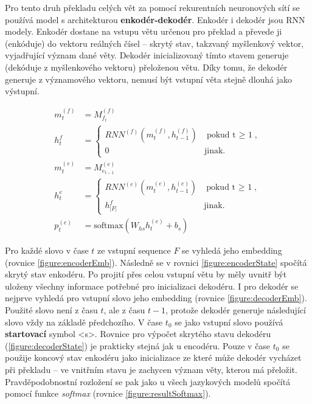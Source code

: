 Pro tento druh překladu celých vět za pomocí rekurentních neuronových sítí se používá model s architekturou \textbf{enkodér-dekodér}. Enkodér i dekodér jsou RNN modely. Enkodér dostane na vstupu větu určenou pro překlad a převede ji (enkóduje) do vektoru reálných čísel -- skrytý stav, takzvaný myšlenkový vektor, vyjadřující význam dané věty. Dekodér inicializovaný tímto stavem generuje (dekóduje z myšlenkového vektoru) přeloženou větu. Díky tomu, že dekodér generuje z významového vektoru, nemusí být vstupní věta stejně dlouhá jako výstupní.


\begin{align}
    m^{(f)}_{t}&=M^{(f)}_{f_t}\label{figure:encoderEmb} \\
    h^{f}_{t}&=\begin{cases}
                    RNN^{(f)}(m^{(f)}_{t},h^{(f)}_{t-1}) & \mbox{pokud t $\geq$ 1},\label{figure:encoderState} \\
                    0 & \mbox{jinak}.
                \end{cases}\\
    m^{(e)}_{t}&=M^{(e)}_{e_{t-1}}\label{figure:decoderEmb} \\
    h^{e}_{t}&=\begin{cases}
                    RNN^{(e)}(m^{(e)}_{t},h^{(e)}_{t-1}) & \mbox{pokud t $\geq$ 1},\\
                    h^{f}_{|F|} & \mbox{jinak}.
                \end{cases}\label{figure:decoderState} \\
    p^{(e)}_{t}&=\mbox{softmax}(W_{hs}h^{(e)}_{t} + b_{s}) \label{figure:resultSoftmax}
\end{align}


Pro každé slovo v čase $t$ ze vstupní sequence $F$ se vyhledá jeho embedding (rovnice \ref{figure:encoderEmb}). Následně se v rovnici \ref{figure:encoderState} spočítá skrytý stav enkodéru. Po projití přes celou vstupní větu by měly uvnitř být uloženy všechny informace potřebné pro inicializaci dekodéru. I pro dekodér se nejprve vyhledá pro vstupní slovo jeho embedding (rovnice \ref{figure:decoderEmb}). Použité slovo není z času $t$, ale z času $t-1$, protože dekodér generuje následující slovo vždy na základě předchozího. V čase $t_0$ se jako vstupní slovo používá \textbf{startovací} symbol <s>. Rovnice pro výpočet skrytého stavu dekodéru (\ref{figure:decoderState}) je prakticky stejná jak u encodéru. Pouze v čase $t_0$ se použije koncový stav enkodéru jako inicializace ze které může dekodér vycházet při překladu -- ve vnitřním stavu je zachycen význam věty, kterou má přeložit. Pravděpodobnostní rozložení se pak jako u všech jazykových modelů spočítá pomocí funkce \emph{softmax} (rovnice \ref{figure:resultSoftmax}).


